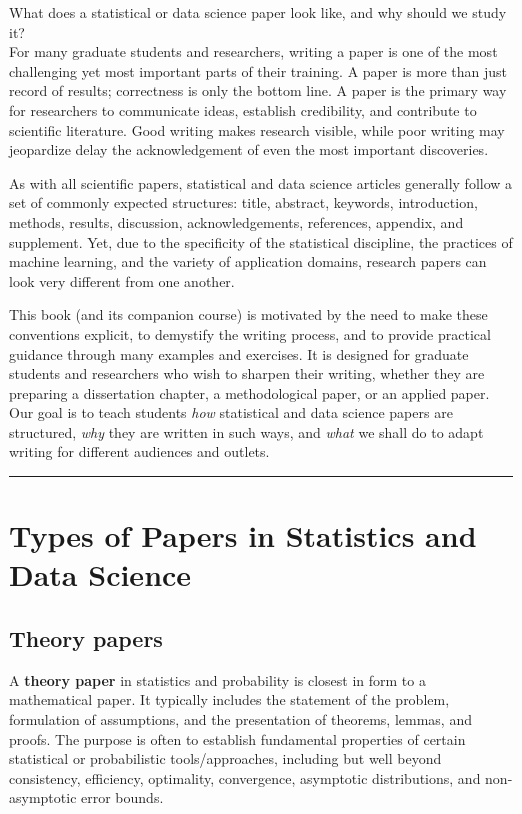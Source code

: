 \documentclass[
]{book}
\theoremstyle{definition}
\theoremstyle{definition}
\theoremstyle{definition}
\theoremstyle{definition}
\theoremstyle{remark}
\begin{document}
What does a statistical or data science paper look like, and why should we study it?\\
For many graduate students and researchers, writing a paper is one of the most challenging yet most important parts of their training. A paper is more than just record of results; correctness is only the bottom line. A paper is the primary way for researchers to communicate ideas, establish credibility, and contribute to scientific literature. Good writing makes research visible, while poor writing may jeopardize delay the acknowledgement of even the most important discoveries.

As with all scientific papers, statistical and data science articles generally follow a set of commonly expected structures: title, abstract, keywords, introduction, methods, results, discussion, acknowledgements, references, appendix, and supplement. Yet, due to the specificity of the statistical discipline, the practices of machine learning, and the variety of application domains, research papers can look very different from one another.

This book (and its companion course) is motivated by the need to make these conventions explicit, to demystify the writing process, and to provide practical guidance through many examples and exercises. It is designed for graduate students and researchers who wish to sharpen their writing, whether they are preparing a dissertation chapter, a methodological paper, or an applied paper. Our goal is to teach students \emph{how} statistical and data science papers are structured, \emph{why} they are written in such ways, and \emph{what} we shall do to adapt writing for different audiences and outlets.

\begin{center}\rule{0.5\linewidth}{0.5pt}\end{center}

\section{Types of Papers in Statistics and Data Science}\label{types-of-papers-in-statistics-and-data-science}

\subsection{Theory papers}\label{theory-papers}

A \textbf{theory paper} in statistics and probability is closest in form to a mathematical paper. It typically includes the statement of the problem, formulation of assumptions, and the presentation of theorems, lemmas, and proofs. The purpose is often to establish fundamental properties of certain statistical or probabilistic tools/approaches, including but well beyond consistency, efficiency, optimality, convergence, asymptotic distributions, and non-asymptotic error bounds.
\end{document}
